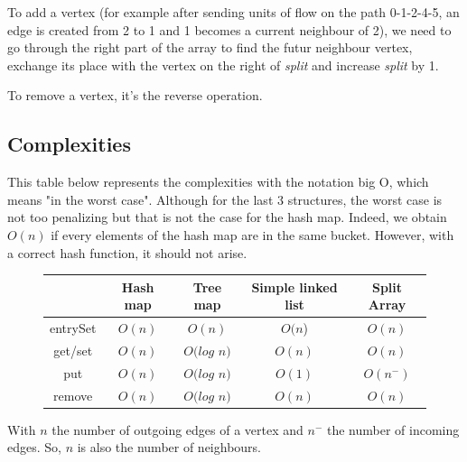 To add a vertex (for example after sending units of flow on the path 0-1-2-4-5, an edge is created from 2 to 1 and 1 becomes a current neighbour of 2), we need to go through the right part of the array to find the futur neighbour vertex, exchange its place with the vertex on the right of \textit{split} and increase \textit{split} by 1. \newline

To remove a vertex, it's the reverse operation.


\subsection{Complexities}

This table below represents the complexities with the notation big O, which means "in the worst case". Although for the last 3 structures, the worst case is not too penalizing but that is not the case for the hash map. Indeed, we obtain $O(n)$ if every elements of the hash map are in the same bucket. However, with a correct hash function, it should not arise. \newline
\begin{figure}[H]
\centering
\begin{tabular}{|c|c|c|c|c|}
	\hline
     & \textbf{Hash map} & \textbf{Tree map} & \textbf{Simple linked list} & \textbf{Split Array} \\
     \hline	
   entrySet & $O(n)$ & $O(n)$ & $O(n$) & $O(n)$\\
   get/set & $O(n)$ & $O(log$ $n)$ & $O(n)$ & $O(n)$\\
   put & $O(n)$ & $O(log$ $n)$ & $O(1)$ & $O(n^-)$\\
   remove & $O(n)$ & $O(log$ $n)$ & $O(n)$ & $O(n)$\\
   \hline
\end{tabular} 
\end{figure}

With $n$ the number of outgoing edges of a vertex and $n^-$ the number of incoming edges. So, $n$ is also the number of neighbours.